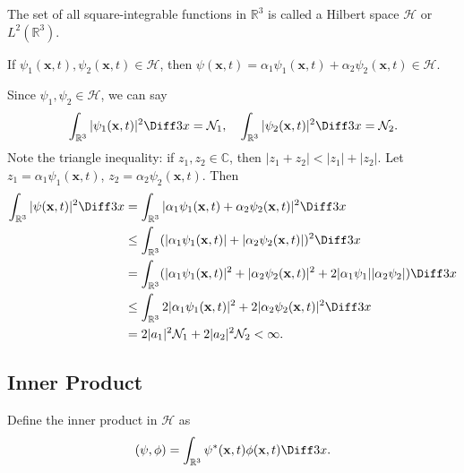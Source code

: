 \documentclass[12pt]{article}
\begin{document}
\begin{definition}
	The set of all square-integrable functions in $\mathbb{R}^3$ is called a Hilbert space $\mathcal{H}$ or $L^2(\mathbb{R}^3)$.
\end{definition}

\begin{theorem}
	If $\psi_1(\mathbf{x}, t), \psi_2(\mathbf{x}, t) \in \mathcal{H}$, then $\psi(\mathbf{x}, t) = \alpha_1 \psi_1(\mathbf{x}, t) + \alpha_2 \psi_2(\mathbf{x}, t) \in \mathcal{H}$.
\end{theorem}

\begin{proofbox}
Since $\psi_1, \psi_2 \in \mathcal{H}$, we can say
\[
	\int_{\mathbb{R}^3} |\psi_1(\mathbf{x}, t)|^2\Diff3 x = \mathcal{N}_1, \quad \int_{\mathbb{R}^3} |\psi_2 (\mathbf{x}, t)|^2\Diff3 x = \mathcal{N}_2
.\]
Note the triangle inequality: if $z_1, z_2 \in \mathbb{C}$, then $|z_1 + z_2| < |z_1| + |z_2|$. Let $z_1 = \alpha_1 \psi_1(\mathbf{x}, t)$, $z_2 = \alpha_2 \psi_2 (\mathbf{x}, t)$. Then
\begin{align*}
	\int_{\mathbb{R}^3}|\psi(\mathbf{x}, t)|^2\Diff3 x &= \int_{\mathbb{R}^3} |\alpha_1 \psi_1(\mathbf{x}, t) + \alpha_2 \psi_2(\mathbf{x}, t)|^2\Diff3 x \\
							   &\leq \int_{\mathbb{R}^3} (|\alpha_1 \psi_1(\mathbf{x}, t)| + |\alpha_2 \psi_2(\mathbf{x}, t)|)^2\Diff3 x \\
							   &= \int_{\mathbb{R}^3}(|\alpha_1 \psi_1(\mathbf{x}, t)|^2 + |\alpha_2 \psi_2(\mathbf{x}, t)|^2 + 2|\alpha_1 \psi_1||\alpha_2\psi_2|)\Diff3 x \\
							   &\leq \int_{\mathbb{R}^3} 2|\alpha_1 \psi_1(\mathbf{x}, t)|^2 + 2|\alpha_2 \psi_2(\mathbf{x}, t)|^2\Diff3 x \\
							   &= 2|a_1|^2\mathcal{N}_1 + 2|a_2|^2\mathcal{N}_2 < \infty.
\end{align*}
\end{proofbox}

\subsection{Inner Product}%
\label{sub:inner_product}

\begin{definition}
	Define the inner product in $\mathcal{H}$ as
	\[
		(\psi, \phi) = \int_{\mathbb{R}^3} \psi^{\ast}(\mathbf{x}, t) \phi(\mathbf{x}, t)\Diff3 x
	.\]
\end{definition}
\end{document}
